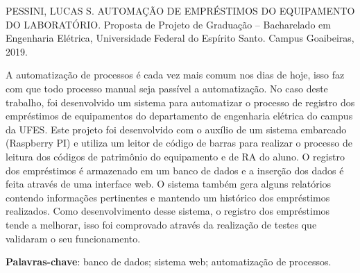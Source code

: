 \documentclass[
	12pt,				%
	openright,			%
	oneside,			%
	a4paper,			%
	chapter=TITLE,		%
	section=TITLE,		%
	english,			%
	french,				%
	spanish,			%
	brazil				%
	]{abntex2}
\begin{document}



\setlength{\absparsep}{18pt} %
\begin{resumo}
PESSINI, LUCAS S. AUTOMAÇÃO DE EMPRÉSTIMOS DO EQUIPAMENTO DO LABORATÓRIO. Proposta de Projeto de Graduação – Bacharelado em Engenharia Elétrica, Universidade Federal do Espírito Santo. Campus
Goaibeiras, 2019.

A automatização de processos é cada vez mais comum nos dias de hoje, isso faz com que todo processo manual seja passível a automatização. No caso deste trabalho, foi desenvolvido um sistema para automatizar o processo de registro dos empréstimos de equipamentos do departamento de engenharia elétrica do campus da UFES. Este projeto foi desenvolvido com o auxílio de um sistema embarcado (Raspberry PI) e utiliza um leitor de código de barras para realizar o processo de leitura dos códigos de patrimônio do equipamento e de RA do aluno. O registro dos empréstimos é armazenado em um banco de dados e a inserção dos dados é feita através de uma interface web. O sistema também gera alguns relatórios contendo informações pertinentes e mantendo um histórico dos empréstimos realizados. Como desenvolvimento desse sistema, o registro dos empréstimos tende a melhorar, isso foi comprovado através da realização de testes que validaram o seu funcionamento.

\textbf{Palavras-chave}: banco de dados; sistema web; automatização de processos.
\end{resumo}

 
\end{document}

